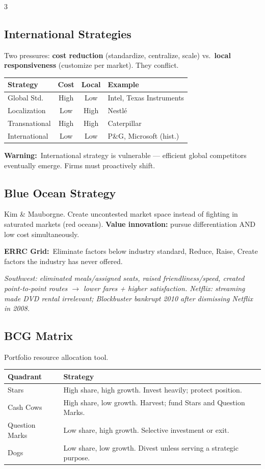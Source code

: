 \documentclass[7.6pt,letterpaper]{article}
\newcommand{\T}[1]{\textbf{\color{navy}#1}}
\newcommand{\kk}[2]{\noindent\T{#1}\ #2\par}
\newcommand{\eg}[1]{\textit{\color{mid}#1}}
\newcommand{\sh}{\rowcolor{strip}}
\newcommand{\ctab}[1]{{\fontsize{6.2pt}{7pt}\selectfont\setlength{\tabcolsep}{2.5pt}#1}}
\begin{document}
\begin{multicols}{3}
\subsection{International Strategies}

Two pressures: \T{cost reduction} (standardize, centralize, scale) vs.\ \T{local responsiveness} (customize per market). They conflict.

\ctab{\begin{tabular}{@{}p{1.8cm}ccp{2.0cm}@{}}
\toprule
\sh \T{Strategy} & \T{Cost} & \T{Local} & \T{Example} \\
\midrule
Global Std. & High & Low & Intel, Texas Instruments \\
Localization & Low & High & Nestlé \\
Transnational & High & High & Caterpillar \\
International & Low & Low & P\&G, Microsoft (hist.) \\
\bottomrule
\end{tabular}}

\kk{Warning:}{International strategy is vulnerable --- efficient global competitors eventually emerge. Firms must proactively shift.}

\subsection{Blue Ocean Strategy}

Kim \& Mauborgne. Create uncontested market space instead of fighting in saturated markets (red oceans). \T{Value innovation:} pursue differentiation AND low cost simultaneously.

\kk{ERRC Grid:}{Eliminate factors below industry standard, Reduce, Raise, Create factors the industry has never offered.}

\eg{Southwest: eliminated meals/assigned seats, raised friendliness/speed, created point-to-point routes $\to$ lower fares + higher satisfaction. Netflix: streaming made DVD rental irrelevant; Blockbuster bankrupt 2010 after dismissing Netflix in 2008.}

\subsection{BCG Matrix}

Portfolio resource allocation tool.

\ctab{\begin{tabular}{@{}p{1.5cm}p{4.1cm}@{}}
\toprule
\sh \T{Quadrant} & \T{Strategy} \\
\midrule
Stars & High share, high growth. Invest heavily; protect position. \\
Cash Cows & High share, low growth. Harvest; fund Stars and Question Marks. \\
Question Marks & Low share, high growth. Selective investment or exit. \\
Dogs & Low share, low growth. Divest unless serving a strategic purpose. \\
\bottomrule
\end{tabular}}


\end{multicols}
\end{document}

